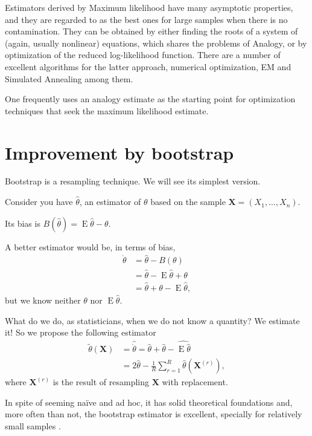 Estimators derived by Maximum likelihood have many asymptotic properties, and they are regarded to as the best ones for large samples when there is no contamination.
They can be obtained by either finding the roots of a system of (again, usually nonlinear) equations, which shares the problems of Analogy, or by optimization of the reduced log-likelihood function.
There are a number of excellent algorithms for the latter approach, numerical optimization\cite{maxLik}, EM and Simulated Annealing among them.

One frequently uses an analogy estimate as the starting point for optimization techniques that seek the maximum likelihood estimate.

\section{Improvement by bootstrap}

Bootstrap is a resampling technique.
We will see its simplest version.

Consider you have $\widehat{\theta}$, an estimator of $\theta$ based on the sample $\bm X=(X_1,\dots,X_n)$.

Its bias is $B(\widehat{\theta})=\operatorname{E}\widehat{\theta}-\theta$.

A better estimator would be, in terms of bias,
\begin{align}
\dot{\theta}	&=\widehat{\theta}-B(\theta)\\
				&=\widehat{\theta}- \operatorname{E}\widehat{\theta}+\theta\nonumber\\
				&=\widehat{\theta}+\theta-\operatorname{E}\widehat{\theta},
\end{align}
but we know neither $\theta$ nor $\operatorname{E}\widehat{\theta}$.

What do we do, as statisticians, when we do not know a quantity?
We estimate it!
So we propose the following estimator
\begin{align}
\widetilde{\theta}(\bm X) &= \widehat{\dot{\theta}} = \widehat{\theta} + \widehat{\theta} - \widehat{\operatorname{E}\widehat{\theta}} \nonumber\\
 &= 2\widehat{\theta} - \frac1R\sum_{r=1}^{R} \widehat{\theta}(\bm X^{(r)}),
\end{align}
where $\bm X^{(r)}$ is the result of resampling $\bm X$ with replacement.

In spite of seeming na\"ive and ad hoc, it has solid theoretical foundations and, more often than not, the bootstrap estimator is excellent, specially for relatively small samples\cite{CribariFrerySilva:CSDA}%
\cite{VasconcellosFrerySilva:CompStat}%
\cite{SilvaCribariFrery:ImprovedLikelihood:Environmetrics}.


